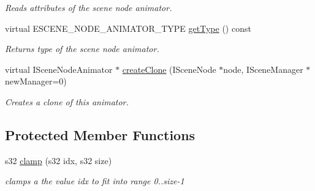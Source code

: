 \begin{DoxyCompactItemize}
\begin{DoxyCompactList}\small\item\em Reads attributes of the scene node animator. \end{DoxyCompactList}\item 
\hypertarget{classirr_1_1scene_1_1_c_scene_node_animator_follow_spline_a6bde10787c5b14a387b3e8ad6cabd271}{virtual E\-S\-C\-E\-N\-E\-\_\-\-N\-O\-D\-E\-\_\-\-A\-N\-I\-M\-A\-T\-O\-R\-\_\-\-T\-Y\-P\-E \hyperlink{classirr_1_1scene_1_1_c_scene_node_animator_follow_spline_a6bde10787c5b14a387b3e8ad6cabd271}{get\-Type} () const }\label{classirr_1_1scene_1_1_c_scene_node_animator_follow_spline_a6bde10787c5b14a387b3e8ad6cabd271}

\begin{DoxyCompactList}\small\item\em Returns type of the scene node animator. \end{DoxyCompactList}\item 
virtual I\-Scene\-Node\-Animator $\ast$ \hyperlink{classirr_1_1scene_1_1_c_scene_node_animator_follow_spline_a5c0874a0894f8a620e5b3deb59b7ee0c}{create\-Clone} (I\-Scene\-Node $\ast$node, I\-Scene\-Manager $\ast$new\-Manager=0)
\begin{DoxyCompactList}\small\item\em Creates a clone of this animator. \end{DoxyCompactList}\end{DoxyCompactItemize}
\subsection*{Protected Member Functions}
\begin{DoxyCompactItemize}
\item 
\hypertarget{classirr_1_1scene_1_1_c_scene_node_animator_follow_spline_a1f41d962087f278246ada5c422a91339}{s32 \hyperlink{classirr_1_1scene_1_1_c_scene_node_animator_follow_spline_a1f41d962087f278246ada5c422a91339}{clamp} (s32 idx, s32 size)}\label{classirr_1_1scene_1_1_c_scene_node_animator_follow_spline_a1f41d962087f278246ada5c422a91339}

\begin{DoxyCompactList}\small\item\em clamps a the value idx to fit into range 0..size-\/1 \end{DoxyCompactList}\end{DoxyCompactItemize}
